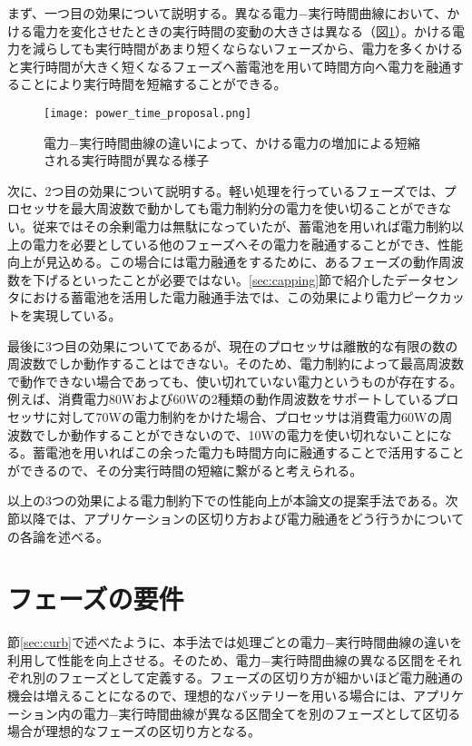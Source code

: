 まず、一つ目の効果について説明する。異なる電力−実行時間曲線において、かける電力を変化させたときの実行時間の変動の大きさは異なる（図\ref{fig:power_time_proposal}）。かける電力を減らしても実行時間があまり短くならないフェーズから、電力を多くかけると実行時間が大きく短くなるフェーズへ蓄電池を用いて時間方向へ電力を融通することにより実行時間を短縮することができる。

\begin{figure}[t]
 \begin{center}
  \texttt{[image: power\_time\_proposal.png]}
 \end{center}
 \caption{電力−実行時間曲線の違いによって、かける電力の増加による短縮される実行時間が異なる様子}
 \label{fig:power_time_proposal}
\end{figure}

次に、2つ目の効果について説明する。軽い処理を行っているフェーズでは、プロセッサを最大周波数で動かしても電力制約分の電力を使い切ることができない。従来ではその余剰電力は無駄になっていたが、蓄電池を用いれば電力制約以上の電力を必要としている他のフェーズへその電力を融通することができ、性能向上が見込める。この場合には電力融通をするために、あるフェーズの動作周波数を下げるといったことが必要ではない。\ref{sec:capping}節で紹介したデータセンタにおける蓄電池を活用した電力融通手法では、この効果により電力ピークカットを実現している。

最後に3つ目の効果についてであるが、現在のプロセッサは離散的な有限の数の周波数でしか動作することはできない。そのため、電力制約によって最高周波数で動作できない場合であっても、使い切れていない電力というものが存在する。例えば、消費電力80Wおよび60Wの2種類の動作周波数をサポートしているプロセッサに対して70Wの電力制約をかけた場合、プロセッサは消費電力60Wの周波数でしか動作することができないので、10Wの電力を使い切れないことになる。蓄電池を用いればこの余った電力も時間方向に融通することで活用することができるので、その分実行時間の短縮に繋がると考えられる。

以上の3つの効果による電力制約下での性能向上が本論文の提案手法である。次節以降では、アプリケーションの区切り方および電力融通をどう行うかについての各論を述べる。


\section{フェーズの要件}
\label{sec:phase1}

節\ref{sec:curb}で述べたように、本手法では処理ごとの電力−実行時間曲線の違いを利用して性能を向上させる。そのため、電力−実行時間曲線の異なる区間をそれぞれ別のフェーズとして定義する。フェーズの区切り方が細かいほど電力融通の機会は増えることになるので、理想的なバッテリーを用いる場合には、アプリケーション内の電力−実行時間曲線が異なる区間全てを別のフェーズとして区切る場合が理想的なフェーズの区切り方となる。

